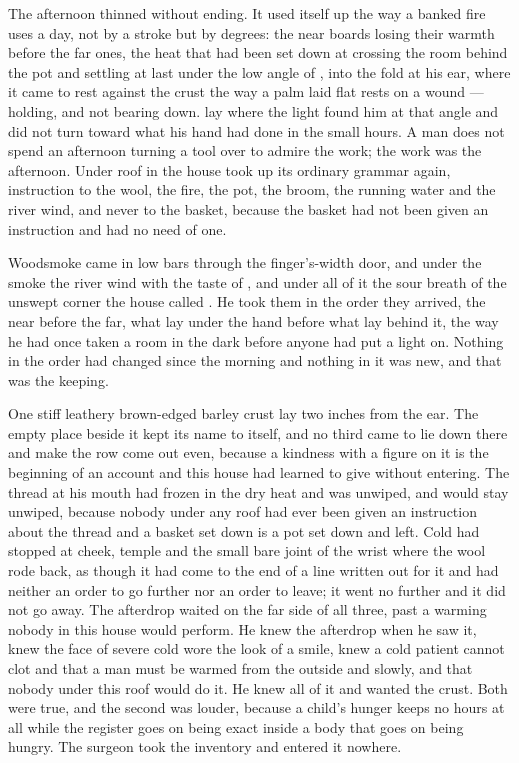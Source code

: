 The afternoon thinned without ending. It used itself up the way a banked fire uses a day, not by a stroke but by degrees: the near boards losing their warmth before the far ones, the heat that had been set down at  crossing the room behind the pot and settling at last under the low angle of , into the fold at his ear, where it came to rest against the crust the way a palm laid flat rests on a wound --- holding, and not bearing down.  lay where the light found him at that angle and did not turn toward what his hand had done in the small hours. A man does not spend an afternoon turning a tool over to admire the work; the work was the afternoon. Under  roof in  the house took up its ordinary grammar again, instruction to the wool, the fire, the pot, the broom, the running water and the river wind, and never to the basket, because the basket had not been given an instruction and had no need of one.

Woodsmoke came in low bars through the finger's-width door, and under the smoke the river wind with the taste of , and under all of it the sour breath of the unswept corner the house called . He took them in the order they arrived, the near before the far, what lay under the hand before what lay behind it, the way he had once taken a room in the dark before anyone had put a light on. Nothing in the order had changed since the morning and nothing in it was new, and that was the keeping.

One stiff leathery brown-edged barley crust lay two inches from the ear. The empty place beside it kept its name to itself, and no third came to lie down there and make the row come out even, because a kindness with a figure on it is the beginning of an account and this house had learned to give without entering. The thread at his mouth had frozen in the dry heat and was unwiped, and would stay unwiped, because nobody under any roof had ever been given an instruction about the thread and a basket set down is a pot set down and left. Cold had stopped at cheek, temple and the small bare joint of the wrist where the wool rode back, as though it had come to the end of a line written out for it and had neither an order to go further nor an order to leave; it went no further and it did not go away. The afterdrop waited on the far side of all three, past a warming nobody in this house would perform. He knew the afterdrop when he saw it, knew the face of severe cold wore the look of a smile, knew a cold patient cannot clot and that a man must be warmed from the outside and slowly, and that nobody under this roof would do it. He knew all of it and wanted the crust. Both were true, and the second was louder, because a child's hunger keeps no hours at all while the register goes on being exact inside a body that goes on being hungry. The surgeon took the inventory and entered it nowhere.

